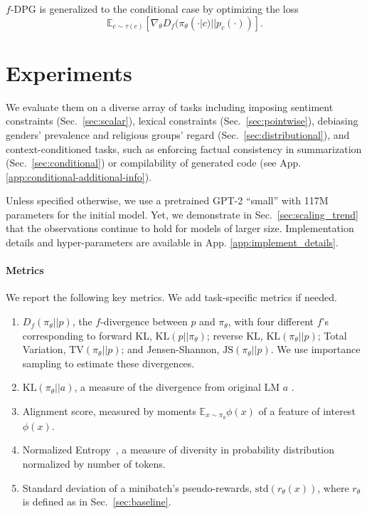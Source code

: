 \begin{fact}\label{fact:conditional}

{$f$-DPG is generalized to the conditional case by optimizing the loss}
\begin{equation}
\mathbb{E}_{c\sim\tau(c)}\left[\nabla_{\theta}D_{f}({\pi_\theta}(\cdotp|c)||p_{c}(\cdotp))\right].
\end{equation}
\end{fact}

\section{Experiments}\label{sec:experiments}

{We evaluate them on a diverse array of tasks  {including} imposing {sentiment constraints} (Sec.~\ref{sec:scalar}), {lexical constraints} (Sec.~\ref{sec:pointwise}), debias{ing} genders' prevalence and religious groups' regard (Sec.~\ref{sec:distributional}), and context-conditioned tasks, such as enforcing factual consistency in summarization (Sec.~\ref{sec:conditional}) or compilability of generated code (see App. \ref{app:conditional-additional-info}).}

{Unless specified otherwise}, we use a pretrained GPT-2 {``small''}  \cite{radford2019language} with 117M parameters for the initial model. Yet, we demonstrate in Sec.~\ref{sec:scaling_trend} that the observations continue to hold for models of larger size. Implementation details and hyper-parameters are available in App. \ref{app:implement_details}.

\paragraph{Metrics} We report the following key metrics. We add task-specific metrics if needed.

\begin{enumerate}
\itemsep0em \item $D_{f}(\pi_{\theta}||p)$, the $f$-divergence between $p$ and ${\pi_\theta}$, with four different $f${'s} corresponding to forward KL, $\mathrm{KL}(p||{\pi_\theta})$; reverse KL, $\mathrm{KL}({\pi_\theta}||p)$; {T}otal {V}ariation, $\mathrm{TV}({\pi_\theta}||p)$; and Jensen-Shannon, $\mathrm{JS}({\pi_\theta}||p)$. We use importance sampling to estimate {these divergences}. 

\item {$\text{KL}(\pi_{\theta}||a)$, a measure of the divergence from original {LM} $a$ \cite{ziegler2019fine,khalifa2021distributional}.}
\item {Alignment score, measured by moments $\mathbb{E}_{x\sim {\pi_\theta}}{\phi(x)}$ of a feature of interest $\phi(x)$.}
\item {Normalized }Entropy~\citep{berger1996maximum}, a measure of diversity in probability distribution normalized by number of tokens.
\item {{Standard deviation} of a minibatch's pseudo-rewards, $\mathrm{std}(r_\theta(x))$, where $r_\theta$ is defined as in Sec.~\ref{sec:baseline}.}

\end{enumerate}

